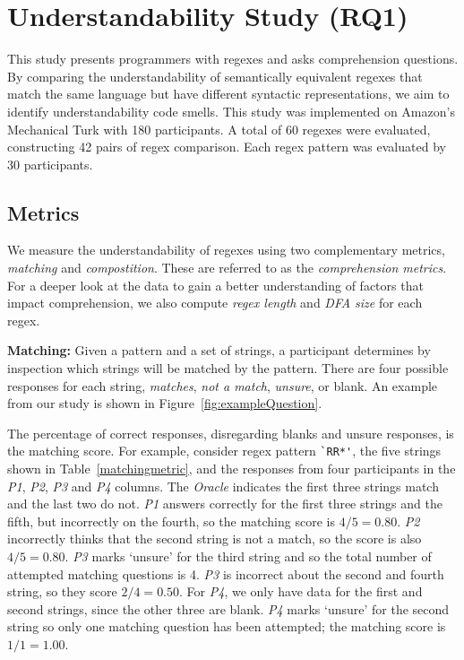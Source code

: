 

\section{Understandability Study (RQ1)}
\label{sec:rq1}
This study presents programmers with regexes and asks comprehension questions. By comparing the understandability of semantically equivalent regexes that match the same language but have different syntactic representations, we aim to identify understandability code smells.
This study was implemented on Amazon's Mechanical Turk with 180 participants. A total of 60 regexes were evaluated, constructing 42 pairs of regex comparison. Each regex pattern was evaluated by 30 participants.







\subsection{Metrics}
\label{sec:understadningmetric}
 We measure the understandability of regexes using two complementary metrics, \emph{matching} and \emph{compostition}. These are referred to as the \emph{comprehension metrics}. 
For a deeper look at the data to gain a better understanding of factors that impact comprehension, we also compute \emph{regex length} and \emph{DFA size} for each regex. 


\textbf{Matching:}
 Given a pattern and a set of strings, a participant determines by inspection which strings will be matched by the pattern. There are four possible responses for each string, \emph{matches}, \emph{not a match}, \emph{unsure}, or blank. An example from our study is shown in Figure~\ref{fig:exampleQuestion}.

 The percentage of correct responses, disregarding blanks and unsure responses, is the matching score.
 For example, consider regex pattern \verb!`RR*'!, the five strings shown in Table~\ref{matchingmetric}, and the responses from four participants in the \emph{P1}, \emph{P2}, \emph{P3} and \emph{P4} columns.
 The {\em Oracle} indicates the first three strings match and the last two do not. \emph{P1} answers correctly for the first three strings and the fifth, but incorrectly on the fourth, so the matching score is $4/5 = 0.80$. \emph{P2} incorrectly thinks that the second string is not a match, so the score is also $4/5 = 0.80$.  \emph{P3} marks `unsure' for the third string and so the total number of attempted matching questions is 4. \emph{P3} is incorrect about the second and fourth string, so they score $2/4 = 0.50$.  For \emph{P4}, we only have data for the first and second strings, since the other three are blank.  \emph{P4} marks `unsure' for the second string so only one matching question has been attempted;  the matching score is $1/1 = 1.00$.

